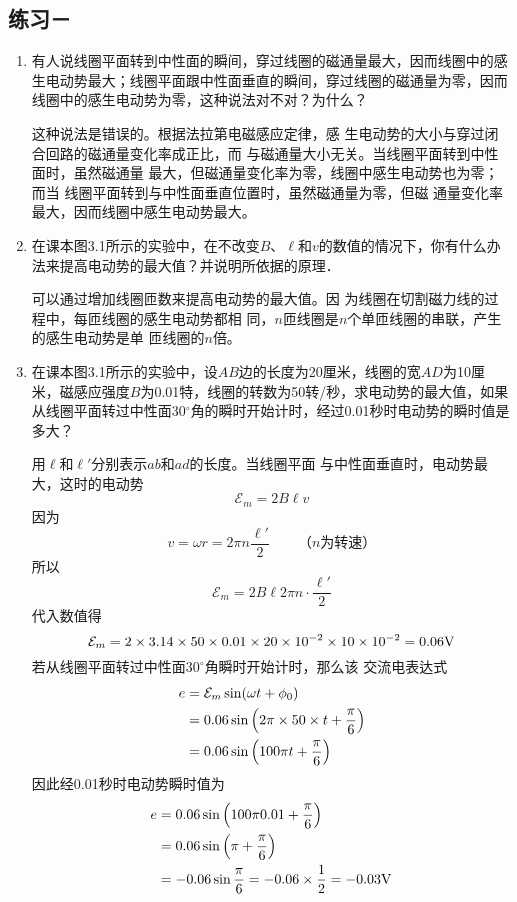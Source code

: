 \subsection{练习－}
\begin{enumerate}
    \item 有人说线圈平面转到中性面的瞬间，穿过线圈的磁通量最大，因而线圈中的感生电动势最大；线圈平面跟中性面垂直的瞬间，穿过线圈的磁通量为零，因而线圈中的感生电动势为零，这种说法对不对？为什么？


    \begin{solution}
        这种说法是错误的。根据法拉第电磁感应定律，感
        生电动势的大小与穿过闭合回路的磁通量变化率成正比，而
        与磁通量大小无关。当线圈平面转到中性面时，虽然磁通量
        最大，但磁通量变化率为零，线圈中感生电动势也为零；而当
        线圈平面转到与中性面垂直位置时，虽然磁通量为零，但磁
        通量变化率最大，因而线圈中感生电动势最大。
    \end{solution}
    
    \item 在课本图3.1所示的实验中，在不改变$B$、$\ell$和$v$的数值的情况下，你有什么办法来提高电动势的最大值？并说明所依据的原理．


    \begin{solution}
        可以通过增加线圈匝数来提高电动势的最大值。因
        为线圈在切割磁力线的过程中，每匝线圈的感生电动势都相
        同，$n$匝线圈是$n$个单匝线圈的串联，产生的感生电动势是单
        匝线圈的$n$倍。
    \end{solution}
    
    \item 在课本图3.1所示的实验中，设$AB$边的长度为20厘米，线圈的宽$AD$为10厘米，磁感应强度$B$为0.01特，线圈的转数为50转/秒，求电动势的最大值，如果从线圈平面转过中性面30$^\circ$角的瞬时开始计时，经过0.01秒时电动势的瞬时值是多大？


    \begin{solution}
        用$\ell$和$\ell'$分别表示$ab$和$ad$的长度。当线圈平面
        与中性面垂直时，电动势最大，这时的电动势
    \[\mathcal{E}_m=2B\ell v\]
    因为
\[v=\omega r=2\pi n\frac{\ell'}{2}\qquad \text{（$n$为转速）}\]
所以
\[\mathcal{E}_m=2B\ell2\pi n\cdot \frac{\ell'}{2} \]
代入数值得
\[\mathcal{E}_m=2\times3.14\times50\times0.01\times20\times10^{-2}\times10\times10^{-2}=0.06{\rm V}\]
若从线圈平面转过中性面$30^{\circ}$角瞬时开始计时，那么该
交流电表达式
\[\begin{split}
   e&= \mathcal{E}_m \sin(\omega t+\phi_0)\\
   &=0.06\sin\left(2\pi \times50\times t+\frac{\pi}{6}\right)\\
   &=0.06\sin\left(100\pi  t+\frac{\pi}{6}\right)
\end{split}\]
因此经0.01秒时电动势瞬时值为
\[\begin{split}
    e &=0.06\sin\left(100\pi  0.01+\frac{\pi}{6}\right)\\
    &=0.06\sin\left(\pi +\frac{\pi}{6}\right)\\
    &=-0.06\sin\frac{\pi}{6}=-0.06\times \frac{1}{2}= -0.03{\rm V}
 \end{split}\]
    \end{solution}
    

\end{enumerate}

